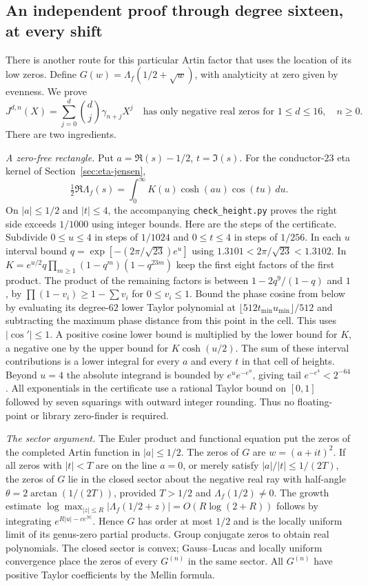 \subsection{An independent proof through degree sixteen, at every shift}
There is another route for this particular Artin factor that uses the
location of its low zeros. Define $G(w)=\Lambda_f(1/2+\sqrt w)$, with
analyticity at zero given by evenness. We prove
\[
 J^{d,n}(X)=\sum_{j=0}^d \binom{d}{j}\gamma_{n+j}X^j
 \quad\text{has only negative real zeros for } 1\le d\le16,\quad n\ge0 .
\]
There are two ingredients.

\textit{A zero-free rectangle.}
Put $a=\Re(s)-1/2$, $t=\Im(s)$. For the conductor-$23$ eta kernel of Section~\ref{sec:eta-jensen},
\[
 \tfrac12\Re\Lambda_f(s)=\int_0^\infty K(u)\cosh(au)\cos(tu)\,du.
\]
On $|a|\le1/2$ and $|t|\le4$, the accompanying \texttt{check\_height.py}
proves the right side exceeds $1/1000$ using integer bounds.
Here are the steps of the certificate. Subdivide $0\le u\le4$ in steps
of $1/1024$ and $0\le t\le4$ in steps of $1/256$. In each $u$ interval
bound $q=\exp[-(2\pi/\sqrt{23})e^u]$ using
$1.3101<2\pi/\sqrt{23}<1.3102$. In
$K=e^{u/2}q\prod_{m\ge1}(1-q^m)(1-q^{23m})$ keep the first eight
factors of the first product. The product of the remaining factors is
between $1-2q^9/(1-q)$ and $1$, by
$\prod(1-v_i)\ge1-\sum v_i$ for $0\le v_i\le1$. Bound the phase cosine
from below by evaluating its degree-$62$ lower Taylor polynomial at
$\lfloor512 t_{\min}u_{\min}\rfloor/512$ and subtracting the maximum
phase distance from this point in the cell. This uses $|\cos'|\le1$.
A positive cosine lower bound is multiplied by the lower bound for
$K$, a negative one by the upper bound for $K\cosh(u/2)$.
The sum of these interval contributions is a lower integral for every $a$
and every $t$ in that cell of heights. Beyond $u=4$ the absolute integrand
is bounded by $e^u e^{-e^u}$, giving tail $e^{-e^4}<2^{-64}$.
All exponentials in the certificate use a rational Taylor bound on
$[0,1]$ followed by seven squarings with outward integer rounding.
Thus no floating-point or library zero-finder is required.

\textit{The sector argument.}
The Euler product and functional equation put the zeros of the completed
Artin function in $|a|\le1/2$. The zeros of $G$ are $w=(a+it)^2$.
If all zeros with $|t|<T$ are on the line $a=0$, or merely satisfy
$|a|/|t|\le1/(2T)$, the zeros of $G$ lie in the closed sector about
the negative real ray with half-angle $\theta=2\arctan(1/(2T))$,
provided $T>1/2$ and $\Lambda_f(1/2)\ne0$. The growth estimate
$\log\max_{|z|\le R}|\Lambda_f(1/2+z)|=O(R\log(2+R))$ follows by
integrating $e^{R|u|-c e^{|u|}}$. Hence $G$ has order at most $1/2$ and
is the locally uniform limit of its genus-zero partial products. Group
conjugate zeros to obtain real polynomials. The closed sector is convex;
Gauss--Lucas and locally uniform convergence place the zeros of every
$G^{(n)}$ in the same sector. All $G^{(n)}$ have positive Taylor
coefficients by the Mellin formula.

